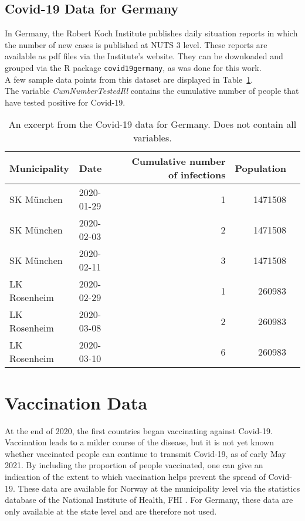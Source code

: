 \subsection{Covid-19 Data for Germany}
In Germany, the Robert Koch Institute publishes daily situation reports in which the number of new cases is published at NUTS 3 level. These reports are available as pdf files via the Institute's website. They can be downloaded and grouped via the R package \texttt{covid19germany}\autocite[][]{covid19germany}, as was done for this work.\\
A few sample data points from this dataset are displayed in Table~\ref{datasetGermany}.\\
The variable \textit{CumNumberTestedIll} contains the cumulative number of people that have tested positive for Covid-19.
\begin{table}[H] 
\caption{An excerpt from the Covid-19 data for Germany. Does not contain all variables.\label{datasetGermany}}
\begin{tabular}{l l r r r}
\toprule
\textbf{Municipality}	& \textbf{Date}	& \textbf{Cumulative number of infections} & \textbf{Population}\\
\midrule
SK München & 2020-01-29 & 1 & 1471508\\
SK München & 2020-02-03 & 2 & 1471508\\
SK München & 2020-02-11 & 3 & 1471508\\
LK Rosenheim & 2020-02-29 & 1 & 260983\\
LK Rosenheim & 2020-03-08 & 2 & 260983 \\
LK Rosenheim & 2020-03-10 & 6 & 260983 \\
\bottomrule
\end{tabular}
\end{table}
\clearpage
\section{Vaccination Data}
At the end of 2020, the first countries began vaccinating against Covid-19. Vaccination leads to a milder course of the disease, but it is not yet known whether vaccinated people can continue to transmit Covid-19, as of early May 2021. By including the proportion of people vaccinated, one can give an indication of the extent to which vaccination helps prevent the spread of Covid-19. These data are available for Norway at the municipality level via the statistics database of the National Institute of Health, FHI \autocite[][]{fhi}. For Germany, these data are only available at the state level and are therefore not used.
\clearpage
